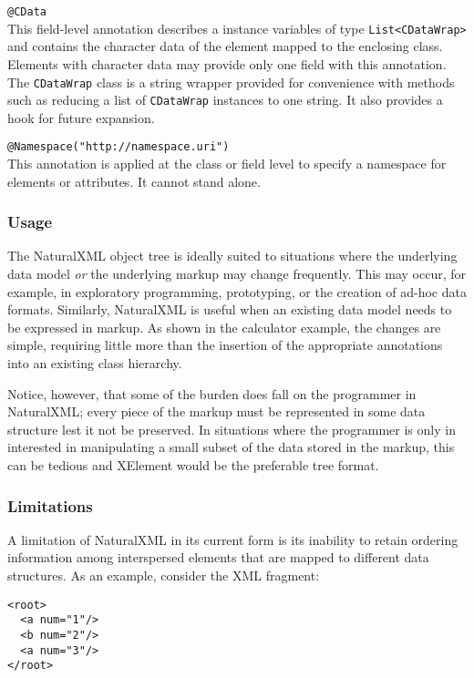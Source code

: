 \vspace*{0.5em}
\noindent\lstinline{@CData}\\
This field-level annotation describes a instance variables of type
\lstinline'List<CDataWrap>' and contains the character data of the
element mapped to the enclosing class.  Elements with character data
may provide only one field with this annotation.  The
\lstinline'CDataWrap' class is a string wrapper provided for
convenience with methods such as reducing a list
of \lstinline'CDataWrap' instances to one string.  It also provides a hook for
future expansion.

\vspace*{0.5em}
\noindent\lstinline{@Namespace("http://namespace.uri")}\\
This annotation is applied at the class or field level to specify
a namespace for elements or attributes.  It cannot stand alone.

\subsubsection{Usage}
The NaturalXML object tree is ideally suited to situations where the
underlying data model \emph{or} the underlying markup may change
frequently.  This may occur, for example, in exploratory programming,
prototyping, or the creation of ad-hoc data formats.  Similarly,
NaturalXML is useful when an existing data model needs to be expressed
in markup.  As shown in the calculator example, the changes are
simple, requiring little more than the insertion of the appropriate
annotations into an existing class hierarchy.

  Notice, however, that some of the burden does fall on the programmer
in NaturalXML; every piece of the markup must be represented in some
data structure lest it not be preserved.  In situations where the
programmer is only in interested in manipulating a small subset of
the data stored in the markup, this can be tedious and XElement would
be the preferable tree format.

\subsubsection{Limitations}
A limitation of NaturalXML in its current form is its inability to
retain ordering information among interspersed elements that are
mapped to different data structures.  As an example, consider the XML
fragment:
\begin{lstlisting} 
<root>
  <a num="1"/>
  <b num="2"/>
  <a num="3"/>
</root>
\end{lstlisting}

